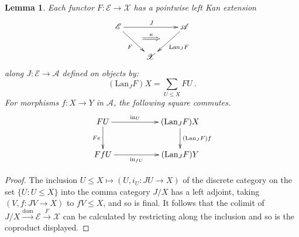 \documentclass[a4paper,12pt,reqno]{amsart}
\newtheorem{lemma}[theorem]{Lemma}
\theoremstyle{definition}
\theoremstyle{fact}
\theoremstyle{genquest}
\theoremstyle{step}
\newcommand{\lra}{\longrightarrow}
\def\CA{{\mathscr A}}
\def\CE{{\mathscr E}}
\def\CX{{\mathscr X}}
\begin{document}
\begin{lemma}\label{leftKan}
Each functor $F:\CE \lra \CX$ has a pointwise left Kan extension
\begin{equation}
\begin{aligned}
\xymatrix{
\CE \ar[rd]_{F}^(0.5){\phantom{a}}="1" \ar[rr]^{J}  && \CA \ar[ld]^{\mathrm{Lan}_JF}_(0.5){\phantom{a}}="2" \ar@{=>}"1";"2"^-{\kappa}
\\
& \CX 
}
\end{aligned}
\end{equation} 
along $J:\CE \lra \CA$ defined on objects by:
$$(\mathrm{Lan}_JF)X = \sum_{U\le X}FU \ .$$
For morphisms $f :X\lra Y$ in $\CA$, the following square commutes.
\begin{equation}
\begin{aligned}
\xymatrix{
FU \ar[rr]^-{\mathrm{in}_U} \ar[d]_-{Fe} && (\mathrm{Lan}_JF)X \ar[d]^-{(\mathrm{Lan}_JF)f} \\
FfU \ar[rr]_-{\mathrm{in}_{fU}} && (\mathrm{Lan}_JF)Y}
\end{aligned}
\end{equation}
\end{lemma}
\begin{proof}
The inclusion $U\le X \mapsto (U, i_U : JU\lra X)$ 
of the discrete category on the set $\{U : U\le X\}$ into the comma category
$J/X$ has a left adjoint, taking $(V,f:JV\lra X)$ to $fV\le X$, and so is final. 
It follows that the colimit of 
$J/X \stackrel{\mathrm{dom}}\lra \CE \stackrel{F}\lra \CX$
can be calculated by restricting along the inclusion and so is the coproduct displayed.
\end{proof}
\end{document}
